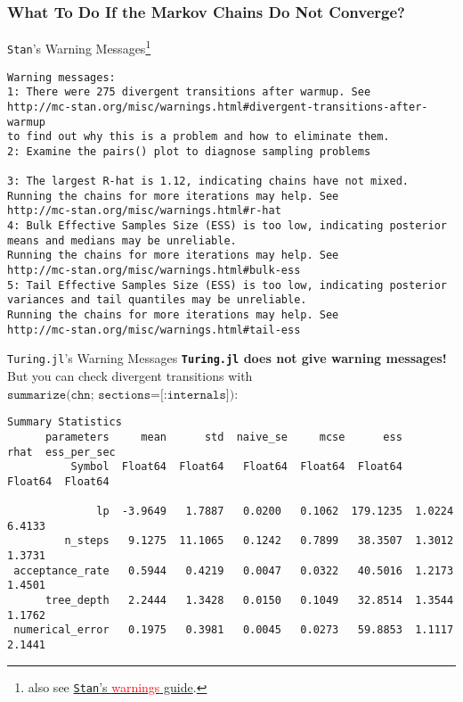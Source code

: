 \subsubsection{What To Do If the Markov Chains Do Not Converge?}
\begin{frame}[fragile]{\texttt{Stan}'s Warning Messages\footnote{also see \href{https://mc-stan.org/misc/warnings.html}{\texttt{Stan}'s \textcolor{red}{warnings} guide}.}}
    \begin{lstlisting}[basicstyle=\footnotesize\color{red}]
Warning messages:
1: There were 275 divergent transitions after warmup. See
http://mc-stan.org/misc/warnings.html#divergent-transitions-after-warmup
to find out why this is a problem and how to eliminate them.
2: Examine the pairs() plot to diagnose sampling problems

3: The largest R-hat is 1.12, indicating chains have not mixed.
Running the chains for more iterations may help. See
http://mc-stan.org/misc/warnings.html#r-hat
4: Bulk Effective Samples Size (ESS) is too low, indicating posterior
means and medians may be unreliable.
Running the chains for more iterations may help. See
http://mc-stan.org/misc/warnings.html#bulk-ess
5: Tail Effective Samples Size (ESS) is too low, indicating posterior
variances and tail quantiles may be unreliable.
Running the chains for more iterations may help. See
http://mc-stan.org/misc/warnings.html#tail-ess
  \end{lstlisting}
\end{frame}

\begin{frame}[fragile]{\texttt{Turing.jl}'s Warning Messages}
    \textbf{\texttt{Turing.jl} does not give warning messages!}
    But you can check divergent transitions with $\texttt{summarize(chn; sections=[:internals])}$:
    \vfill
    \begin{lstlisting}[basicstyle=\footnotesize]
Summary Statistics
      parameters     mean      std  naive_se     mcse      ess     rhat  ess_per_sec
          Symbol  Float64  Float64   Float64  Float64  Float64  Float64  Float64

              lp  -3.9649   1.7887   0.0200   0.1062  179.1235  1.0224   6.4133
         n_steps   9.1275  11.1065   0.1242   0.7899   38.3507  1.3012   1.3731
 acceptance_rate   0.5944   0.4219   0.0047   0.0322   40.5016  1.2173   1.4501
      tree_depth   2.2444   1.3428   0.0150   0.1049   32.8514  1.3544   1.1762
 numerical_error   0.1975   0.3981   0.0045   0.0273   59.8853  1.1117   2.1441
  \end{lstlisting}
\end{frame}

